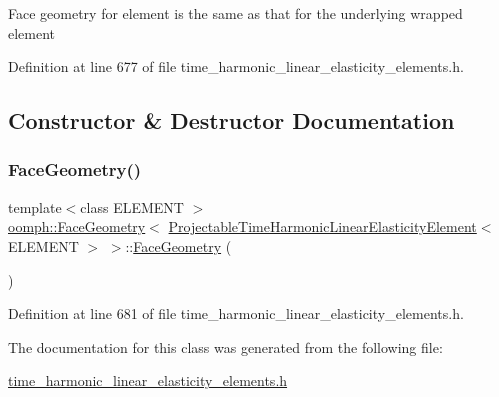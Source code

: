 Face geometry for element is the same as that for the underlying wrapped element 

Definition at line 677 of file time\+\_\+harmonic\+\_\+linear\+\_\+elasticity\+\_\+elements.\+h.



\subsection{Constructor \& Destructor Documentation}
\mbox{\label{classoomph_1_1FaceGeometry_3_01ProjectableTimeHarmonicLinearElasticityElement_3_01ELEMENT_01_4_01_4_a3ba6d3147867d1d008e33355569d1b21}} 
\subsubsection{\texorpdfstring{Face\+Geometry()}{FaceGeometry()}}
{\footnotesize\ttfamily template$<$class E\+L\+E\+M\+E\+NT $>$ \\
\hyperlink{classoomph_1_1FaceGeometry}{oomph\+::\+Face\+Geometry}$<$ \hyperlink{classoomph_1_1ProjectableTimeHarmonicLinearElasticityElement}{Projectable\+Time\+Harmonic\+Linear\+Elasticity\+Element}$<$ E\+L\+E\+M\+E\+NT $>$ $>$\+::\hyperlink{classoomph_1_1FaceGeometry}{Face\+Geometry} (\begin{DoxyParamCaption}{ }\end{DoxyParamCaption})\hspace{0.3cm}{\ttfamily [inline]}}



Definition at line 681 of file time\+\_\+harmonic\+\_\+linear\+\_\+elasticity\+\_\+elements.\+h.



The documentation for this class was generated from the following file\+:\begin{DoxyCompactItemize}
\item 
\hyperlink{time__harmonic__linear__elasticity__elements_8h}{time\+\_\+harmonic\+\_\+linear\+\_\+elasticity\+\_\+elements.\+h}\end{DoxyCompactItemize}
